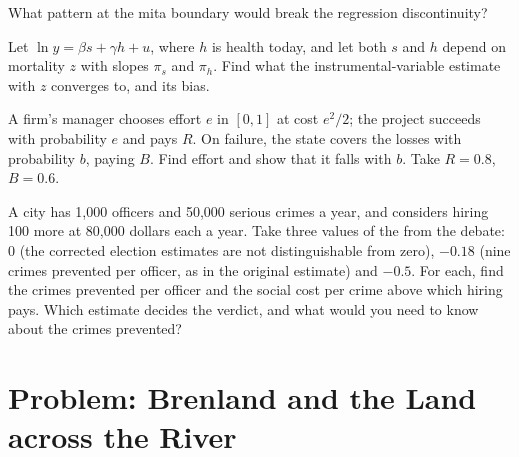 \begin{exercise}[$\star\star$]\label{exo:b3:institutions:9}
What pattern at the mita boundary would break the regression discontinuity?
\end{exercise}

\begin{exercise}[$\star\star\star$]\label{exo:b3:institutions:10}
Let $\ln y = \beta s + \gamma h + u$, where $h$ is health today, and let both $s$ and $h$ depend on mortality $z$ with
slopes $\pi_s$ and $\pi_h$. Find what the instrumental-variable estimate with $z$ converges to, and
its bias.
\end{exercise}

\begin{exercise}[$\star\star\star$]\label{exo:b3:institutions:11}
A firm's manager chooses effort $e$ in $[0, 1]$ at cost $e^2/2$; the project succeeds with
probability $e$ and pays $R$. On failure, the state covers the losses with probability $b$,
paying $B$. Find effort and show that it falls with $b$. Take $R = 0.8$, $B = 0.6$.
\end{exercise}

\begin{exercise}[$\star\star\star$]\label{exo:b3:institutions:12}
A city has 1{,}000 officers and 50{,}000 serious crimes a year, and considers hiring 100 more
at 80{,}000 dollars each a year. Take three values of the  from
the debate: 0 (the corrected election estimates are not distinguishable from zero),
$-0.18$ (nine crimes prevented per officer, as in the original estimate) and $-0.5$. For
each, find the crimes prevented per officer and the social cost per crime above which
hiring pays. Which estimate decides the verdict, and what would you need to know
about the crimes prevented?
\end{exercise}

\section{Problem: Brenland and the Land across the River}\label{sec:b3:institutions:problem}

